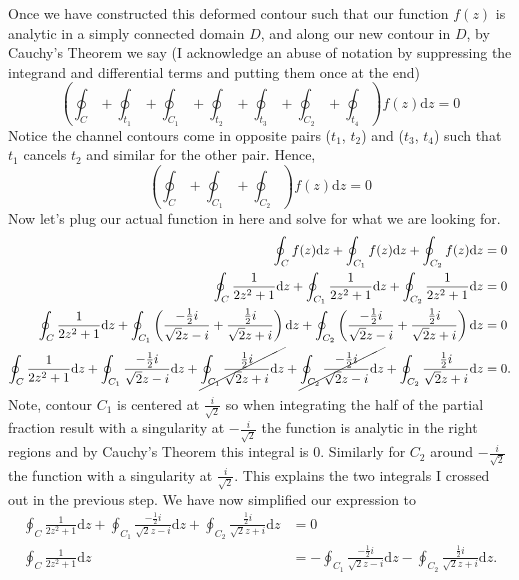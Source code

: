 \documentclass[10pt]{amsart}
\newcommand{\D}{\mathrm{d}}
\theoremstyle{nonumberplain}
\begin{document}
\begin{enumerate}[label={\bf {\arabic*}:}]
\noindent
Once we have constructed this deformed contour such that our function $f(z)$ is analytic in a simply connected domain $D$, and along our new contour in $D$, by Cauchy's Theorem we say (I acknowledge an abuse of notation by suppressing the integrand and differential terms and putting them once at the end)
$$
\left(\oint_C + \oint_{t_1} + \oint_{C_1} + \oint_{t_2} + \oint_{t_3}  + \oint_{C_2} + \oint_{t_4}\right) f(z) \D z = 0
$$
Notice the channel contours come in opposite pairs ($t_1$, $t_2$) and ($t_3$, $t_4$) such that $t_1$ cancels $t_2$ and similar for the other pair.
Hence,
$$
\left(\oint_C + \oint_{C_1} + \oint_{C_2} \right) f(z) \D z = 0
$$
Now let's plug our actual function in here and solve for what we are looking for.
\begin{align*}
\oint_C f(z) \D z + \oint_{C_1} f(z) \D z + \oint_{C_2} f(z) \D z &= 0 \\
\oint_C \frac{1}{2z^2 + 1} \D z + \oint_{C_1} \frac{1}{2z^2 + 1} \D z + \oint_{C_2} \frac{1}{2z^2 + 1} \D z &= 0 \\
\oint_C \frac{1}{2z^2 + 1} \D z
	+ \oint_{C_1} \left( \frac{-\frac1 2 i}{\sqrt{2}z - i} + \frac{\frac1 2 i}{\sqrt{2}z + i}\right) \D z
	+ \oint_{C_2} \left( \frac{-\frac1 2 i}{\sqrt{2}z - i} + \frac{\frac1 2 i}{\sqrt{2}z + i} \right) \D z &= 0 \\
\oint_C \frac{1}{2z^2 + 1} \D z
	+ \oint_{C_1} \frac{-\frac1 2 i}{\sqrt{2}z - i}  \D z
	+ \cancel{\oint_{C_1} \frac{\frac1 2 i}{\sqrt{2}z + i} \D z}
	+ \cancel{\oint_{C_2} \frac{-\frac1 2 i}{\sqrt{2}z - i}  \D z}
	+ \oint_{C_2} \frac{\frac1 2 i}{\sqrt{2}z + i} \D z &= 0. \\
\end{align*}
Note, contour $C_1$ is centered at $\frac{i}{\sqrt{2}}$ so when integrating the half of the partial fraction result with a singularity at $- \frac{i}{\sqrt{2}}$ the function is analytic in the right regions and by Cauchy's Theorem this integral is $0$.
Similarly for $C_2$ around $-\frac{i}{\sqrt{2}}$ the function with a singularity at $\frac{i}{\sqrt{2}}$.
This explains the two integrals I crossed out in the previous step.
We have now simplified our expression to
\begin{align*}
\oint_C \frac{1}{2z^2 + 1} \D z
	+ \oint_{C_1} \frac{-\frac1 2 i}{\sqrt{2}z - i}  \D z
	+ \oint_{C_2} \frac{\frac1 2 i}{\sqrt{2}z + i} \D z &= 0 \\
\oint_C \frac{1}{2z^2 + 1} \D z
 &= - \oint_{C_1} \frac{-\frac1 2 i}{\sqrt{2}z - i}  \D z
	- \oint_{C_2} \frac{\frac1 2 i}{\sqrt{2}z + i} \D z.
\end{align*}

\end{enumerate}
\end{document}
